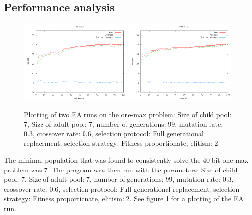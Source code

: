 \documentclass[11pt]{article}
\begin{document}
\subsection*{Performance analysis} %

\begin{figure}[ht]
\begin{center}
\mbox{\includegraphics[width=0.49\textwidth]{images/11.png}}
\mbox{\includegraphics[width=0.49\textwidth]{images/12.png}}
\end{center}
\caption{Plotting of two EA runs on the one-max problem:
Size of child pool: 7,
Size of adult pool: 7,
number of generations: 99,
mutation rate: 0.3,
crossover rate: 0.6,
selection protocol: Full generational replacement,
selection strategy: Fitness proportionate,
elitism: 2}
\label{fig:1}
\end{figure}

The minimal population that was found to consistently solve the 40 bit one-max
problem was 7. The program was then run with the parameters: 
Size of child pool: 7,
Size of adult pool: 7,
number of generations: 99,
mutation rate: 0.3,
crossover rate: 0.6,
selection protocol: Full generational replacement,
selection strategy: Fitness proportionate,
elitism: 2.
See figure \ref{fig:1} for a plotting of the EA run.
\end{document}
